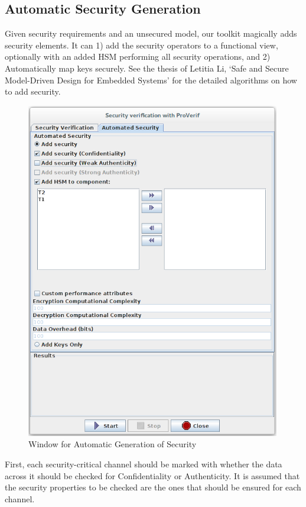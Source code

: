 \documentclass[12pt]{article}
\begin{document}
\subsection{Automatic Security Generation}

Given security requirements and an unsecured model, our toolkit magically adds security elements. It can 1) add the security operators to a functional view, optionally with an added HSM performing all security operations, and 2) Automatically map keys securely. See the thesis of Letitia Li, `Safe and Secure Model-Driven Design for Embedded Systems' for the detailed algorithms on how to add security.

\begin{figure}[htbp]
\centering
\includegraphics[width=0.99\textwidth]{fig/automaticgeneration.png}
\caption{Window for Automatic Generation of Security} \label{fig:autogen}
\end{figure}

First, each security-critical channel should be marked with whether the data across it should be checked for Confidentiality or Authenticity. It is assumed that the security properties to be checked are the ones that should be ensured for each channel.
\end{document}
